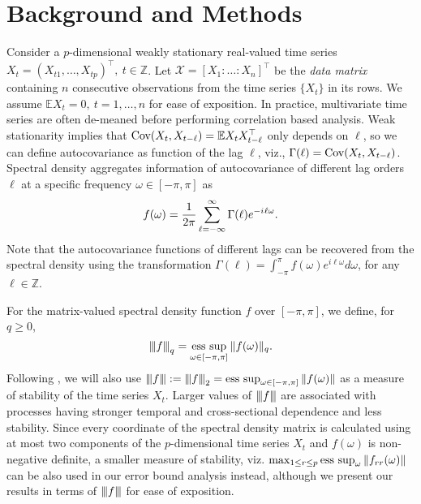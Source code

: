 \section{Background and Methods}\label{sec:model-methods}
Consider a $p$-dimensional weakly stationary real-valued time series $X_t = (X_{t1}, \ldots, X_{tp})^\top, ~ t\in \mathbb{Z}$. Let  $\mathcal{X} = [X_1:\ldots:X_n]^\top$  be the \textit{data matrix} containing $n$ consecutive observations from the time series $\{X_t\}$ in its rows. We assume $\mathbb{E} X_t = 0, ~ t=1,\ldots,n$ for ease of exposition. In practice, multivariate time series are often de-meaned before performing correlation based analysis. Weak stationarity implies that $\mbox{Cov}(X_t, X_{t-\ell}) = \mathbb{E} X_t X_{t-\ell}^\top$ only depends on $\ell$, so we can define autocovariance as function of the lag $\ell$, viz., $\Gamma(\ell) = \mbox{Cov}(X_t, X_{t-\ell})$. Spectral density aggregates information of autocovariance of different lag orders $\ell$  at a specific frequency $\omega \in [-\pi, \pi]$ as 
\begin{equation}
f(\omega) = \frac{1}{2\pi}\sum_{\ell=-\infty}^\infty \Gamma(\ell) e^{-{i\mkern1mu} \ell \omega }. 
\end{equation}
Note that the autocovariance functions of different lags can be recovered from the spectral density using the transformation  $\Gamma(\ell) =  \int_{-\pi}^{\pi} f(\omega) e^{i\ell \omega} d\omega$, for any $\ell \in \mathbb{Z}$.



For the matrix-valued spectral density function $f$ over $[-\pi, \pi]$, we define, for $q \ge 0$,
\begin{equation}
\vertiii{f}_q = \esssup_{\omega \in [-\pi, \pi]}\|f(\omega)\|_q. \nonumber
\end{equation}
Following \cite{Basu2015}, we will also use 
$\vertiii{f}: = \vertiii{f}_2 = \esssup_{\omega \in [-\pi, \pi]}\|f(\omega)\| $
as a measure of stability of the time series $X_t$. Larger values of ${\left\vert\kern-0.25ex\left\vert\kern-0.25ex\left\vert f \right\vert\kern-0.25ex\right\vert\kern-0.25ex\right\vert}$ are associated with processes having stronger temporal and cross-sectional  dependence and less stability. Since every coordinate of the spectral density matrix is calculated using at most two components of the $p$-dimensional time series $X_t$ and $f(\omega)$ is non-negative definite, a smaller measure of stability, viz. $\max_{1 \le r \le p} \esssup_\omega \|f_{rr}(\omega)\|$ can be also used in our error bound analysis instead, although we present our results in terms of ${\left\vert\kern-0.25ex\left\vert\kern-0.25ex\left\vert f \right\vert\kern-0.25ex\right\vert\kern-0.25ex\right\vert}$ for ease of exposition.

